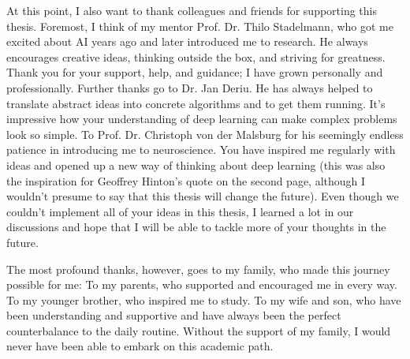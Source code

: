 At this point, I also want to thank colleagues and friends for supporting this thesis.
Foremost, I think of my mentor Prof. Dr. Thilo Stadelmann, who got me excited about AI years ago and later introduced me to research.
He always encourages creative ideas, thinking outside the box, and striving for greatness.
Thank you for your support, help, and guidance; I have grown personally and professionally.
Further thanks go to Dr. Jan Deriu. 
He has always helped to translate abstract ideas into concrete algorithms and to get them running.
It's impressive how your understanding of deep learning can make complex problems look so simple.
To Prof. Dr. Christoph von der Malsburg for his seemingly endless patience in introducing me to neuroscience.
You have inspired me regularly with ideas and opened up a new way of thinking about deep learning (this was also the inspiration for Geoffrey Hinton's quote on the second page, although I wouldn't presume to say that this thesis will change the future).
Even though we couldn't implement all of your ideas in this thesis, I learned a lot in our discussions and hope that I will be able to tackle more of your thoughts in the future.

The most profound thanks, however, goes to my family, who made this journey possible for me:
To my parents, who supported and encouraged me in every way.
To my younger brother, who inspired me to study.
To my wife and son, who have been understanding and supportive and have always been the perfect counterbalance to the daily routine.
Without the support of my family, I would never have been able to embark on this academic path.
\normalsize

